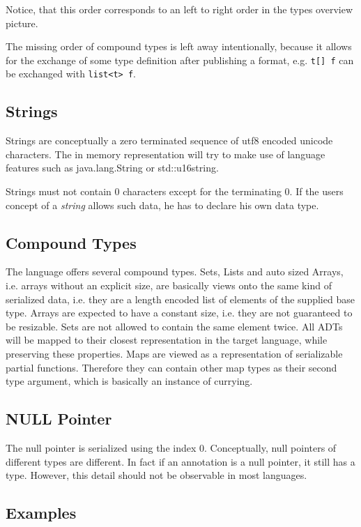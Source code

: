 \documentclass[a4paper,10pt]{article}
\begin{document}
Notice, that this order corresponds to an left to right order in the types overview picture.

The missing order of compound types is left away intentionally, because it allows for the exchange of some type definition after publishing a format, e.g. \verb/t[] f/ can be exchanged with \verb/list<t> f/.


\subsection*{Strings}

Strings are conceptually a zero terminated sequence of utf8 encoded unicode characters. The in memory representation will try to make use of language features such as java.lang.String or std::u16string.

Strings must not contain 0 characters except for the terminating 0. If the users concept of a \textit{string} allows such data, he has to declare his own data type.

\subsection*{Compound Types}

The language offers several compound types. Sets, Lists and auto sized Arrays, i.e. arrays without an explicit size, are basically views onto the same kind of serialized data, i.e. they are a length encoded list of elements of the supplied base type. Arrays are expected to have a constant size, i.e. they are not guaranteed to be resizable. Sets are not allowed to contain the same element twice.
All ADTs will be mapped to their closest representation in the target language, while preserving these properties.
Maps are viewed as a representation of serializable partial functions. Therefore they can contain other map types as their second type argument, which is basically an instance of currying.

\subsection*{NULL Pointer}

The null pointer is serialized using the index 0. Conceptually, null pointers of different types are different. In fact if an annotation is a null pointer, it still has a type. However, this detail should not be observable in most languages.


\subsection{Examples}
\end{document}
